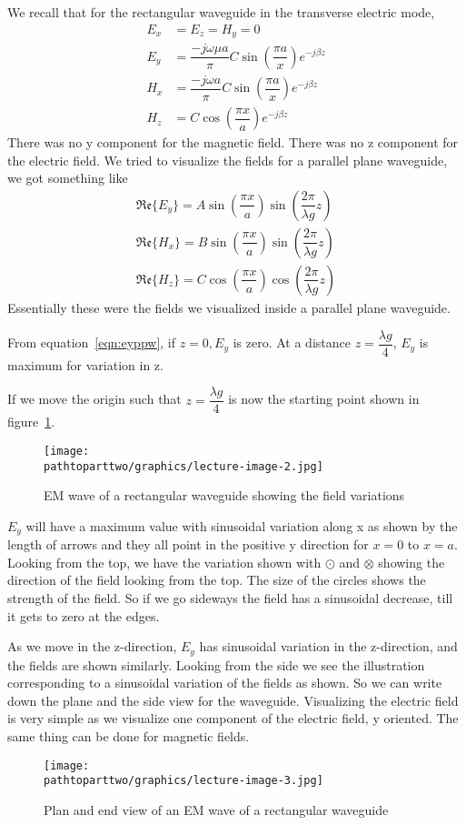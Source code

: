 We recall that for the rectangular waveguide in the transverse electric mode,
\begin{align*}
E_{x} &= E_{z} = H_{y} = 0\\
E_{y} &= \dfrac{-j\omega\mu a }{\pi} C\sin(\dfrac{\pi a}{x}) e ^{-j\beta z}\\
H_{x} &= \dfrac{-j\omega a}{\pi} C \sin(\dfrac{\pi a}{x})e^{-j\beta z} \\
H_{z} &= C\cos(\dfrac{\pi x}{a}) e^{-j\beta z}
\end{align*}
There was no y component for the magnetic field. There was no z component for the electric field. We tried to visualize the fields for a parallel plane waveguide, we got something like 
\begin{align}
\mathfrak{Re}\{E_{y}\} = A\sin(\dfrac{\pi x}{a})\sin(\dfrac{2\pi}{\lambda g}z)
\label{eqn:eyppw}\\
\mathfrak{Re}\{H_{x}\} = B\sin(\dfrac{\pi x}{a})\sin(\dfrac{2\pi}{\lambda g}z)\\
\mathfrak{Re}\{H_{z}\} = C\cos(\dfrac{\pi x}{a})\cos(\dfrac{2\pi}{\lambda g}z)
\end{align}
Essentially these were the fields we visualized inside a parallel plane waveguide.

From equation~\ref{eqn:eyppw}, if $z = 0, E_{y}$ is zero. At a distance $ z = \dfrac{\lambda g}{4}$, $E_{y}$ is maximum for variation in z.

If we move the origin such that $z = \dfrac{\lambda g}{4}$ is now the starting point shown in figure~\ref{fig:lectureimage2}.
\begin{figure}[h]
\centering
\texttt{[image: \\pathtoparttwo/graphics/lecture-image-2.jpg]}
\label{fig:lectureimage2}
\caption{EM wave of a rectangular waveguide showing the field variations}
\end{figure}
$E_{y}$ will have a maximum value with sinusoidal variation along x as shown by the length of arrows and they all point in the positive y direction for $x = 0$ to $x = a$. Looking from the top, we have the variation shown with $\odot$ and $\otimes$ showing the direction of the field looking from the top. The size of the circles shows the strength of the field. So if we go sideways the field has a sinusoidal decrease, till it gets to zero at the edges.
 
As we move in the z-direction, $E_{y}$ has sinusoidal variation in the z-direction, and the fields are shown similarly. Looking from the side we see the illustration corresponding to a sinusoidal variation of the fields as shown. So we can write down the plane and the side view for the waveguide. Visualizing the electric field is very simple as we visualize one component of the electric field, y oriented. The same thing can be done for magnetic fields.
\begin{figure}[h]
\centering
\texttt{[image: \\pathtoparttwo/graphics/lecture-image-3.jpg]}
\label{fig:lectureimage3}
\caption{Plan and end view of an EM wave of a rectangular waveguide}
\end{figure}

